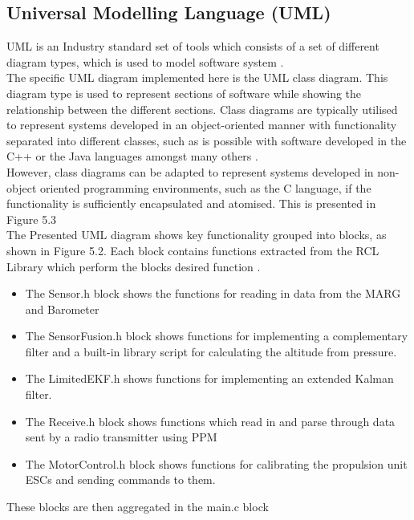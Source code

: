 \documentclass[12pt,a4paper,twoside]{report}
\begin{document}
			\subsection{Universal Modelling Language (UML)}
			
				UML is an Industry standard set of tools which consists of a set of different diagram types, which is used to model software system \cite{30}.
				\\
				The specific UML diagram implemented here is the UML class diagram. This diagram type is used to represent sections of software while showing the relationship between the different sections. Class diagrams are typically utilised to represent systems developed in an object-oriented manner with functionality separated into different classes, such as is possible with software developed in the C++ or the Java languages amongst many others \cite{30}. 
				\\
				However, class diagrams can be adapted to represent systems developed in non-object oriented programming environments, such as the C language, if the functionality is sufficiently encapsulated and atomised. This is presented in Figure 5.3
				\\
				The Presented UML diagram shows key functionality grouped into blocks, as shown in Figure 5.2. Each block contains functions extracted from the RCL Library which perform the blocks desired function \cite{31}.
				\\
				\begin{itemize}
					
					\item 
						The Sensor.h block shows the functions for reading in data from the MARG and Barometer
					\item 
						The SensorFusion.h block shows functions for implementing a complementary filter and a built-in library script for calculating the altitude from pressure.
					\item
						The LimitedEKF.h shows functions for implementing an extended Kalman filter.
					\item
						The Receive.h block shows functions which read in and parse through data sent by a radio transmitter using PPM
					\item
						The MotorControl.h block shows functions for calibrating the propulsion unit ESCs and sending commands to them.
				\end{itemize}
			
				These blocks are then aggregated in the main.c block
				\\
				
\end{document}
